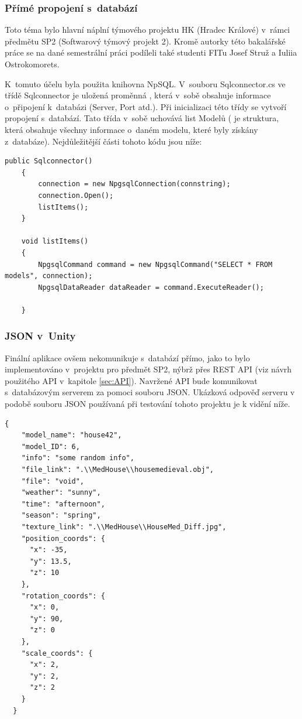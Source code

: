 \documentclass[thesis=B,czech]{FITthesis}[2012/06/26]
\begin{document}
\subsubsection{Přímé propojení s~databází}
 Toto téma bylo hlavní náplní týmového projektu HK (Hradec Králové) v~rámci předmětu SP2 (Softwarový týmový projekt 2). Kromě autorky této bakalářské práce se na dané semestrální práci podíleli také studenti FITu Josef Struž a Iuliia Ostrokomorets. 
   
    K~tomuto účelu byla použita knihovna NpSQL. V~souboru Sqlconnector.cs ve třídě Sqlconnector je uložená proměnná , která v~sobě obsahuje informace o~připojení k~databázi (Server, Port atd.). Při inicializaci této třídy se vytvoří propojení s~databází. Tato třída v~sobě uchovává list Modelů ( je struktura, která obsahuje všechny informace o~daném modelu, které byly získány z~databáze). Nejdůležitější části tohoto kódu jsou níže:
    \begin{lstlisting}[frame=single]
    public Sqlconnector()
    {
        connection = new NpgsqlConnection(connstring);
        connection.Open();
        listItems();              
    }

    void listItems()
    {
        NpgsqlCommand command = new NpgsqlCommand("SELECT * FROM models", connection);
        NpgsqlDataReader dataReader = command.ExecuteReader();
        
    }
	\end{lstlisting}
    
    \subsubsection{JSON v~Unity}
	
	Finální aplikace ovšem nekomunikuje s~databází přímo, jako to bylo implementováno v~projektu pro předmět SP2, nýbrž přes REST API (viz návrh použitého API v~kapitole \ref{sec:API}). Navržené API bude komunikovat s~databázovým serverem za pomoci souboru JSON. Ukázková odpověď serveru v podobě souboru JSON používaná při testování tohoto projektu je k vidění níže.
	\begin{lstlisting}[frame=single]
	{
    "model_name": "house42",
    "model_ID": 6,
    "info": "some random info",
    "file_link": ".\\MedHouse\\housemedieval.obj",
    "file": "void",
    "weather": "sunny",
    "time": "afternoon",
    "season": "spring",
    "texture_link": ".\\MedHouse\\HouseMed_Diff.jpg",
    "position_coords": {
      "x": -35,
      "y": 13.5,
      "z": 10
    },
    "rotation_coords": {
      "x": 0,
      "y": 90,
      "z": 0
    },
    "scale_coords": {
      "x": 2,
      "y": 2,
      "z": 2
    }
  }

\end{lstlisting}
	
\end{document}
